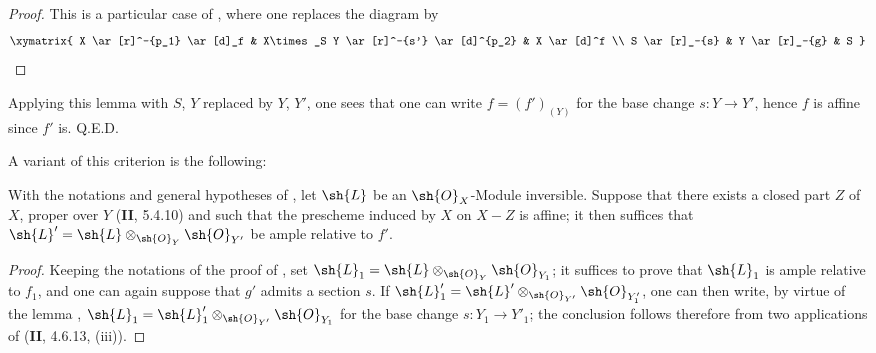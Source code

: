 \begin{proof}
This is a particular case of , where one replaces the diagram by
\[
\xymatrix{
  X \ar[r]^-{p_1} \ar[d]_f & X\times_S Y \ar[r]^-{s'} \ar[d]^{p_2} & X \ar[d]^f \\
  S \ar[r]_-{s} & Y \ar[r]_-{g} & S
}
\]
\end{proof}

Applying this lemma with $S$, $Y$ replaced by $Y$, $Y'$, one sees that one can write $f=(f')_{(Y)}$ for the base change $s:Y\to Y'$, hence $f$ is affine since $f'$ is.
Q.E.D.

A variant of this criterion is the following:

\begin{corollary}[14.5.12]
\label{IV.14.5.12}
With the notations and general hypotheses of , let $\sh{L}$ be an $\sh{O}_X$-Module inversible.
Suppose that there exists a closed part $Z$ of $X$, proper over $Y$ (\textbf{II}, 5.4.10) and such that the prescheme induced by $X$ on $X-Z$ is affine; it then suffices that $\sh{L}'=\sh{L}\otimes_{\sh{O}_Y}\sh{O}_{Y'}$ be ample relative to $f'$.
\end{corollary}

\begin{proof}
Keeping the notations of the proof of , set $\sh{L}_1=\sh{L}\otimes_{\sh{O}_Y}\sh{O}_{Y_1}$; it suffices to prove that $\sh{L}_1$ is ample relative to $f_1$, and one can again suppose that $g'$ admits a section $s$.
If $\sh{L}'_1=\sh{L}'\otimes_{\sh{O}_{Y'}}\sh{O}_{Y'_1}$, one can then write, by virtue of the lemma , $\sh{L}_1=\sh{L}'_1\otimes_{\sh{O}_{Y'}}\sh{O}_{Y_1}$ for the base change $s:Y_1\to Y'_1$; the conclusion follows therefore from two applications of (\textbf{II}, 4.6.13, (iii)).
\end{proof}
